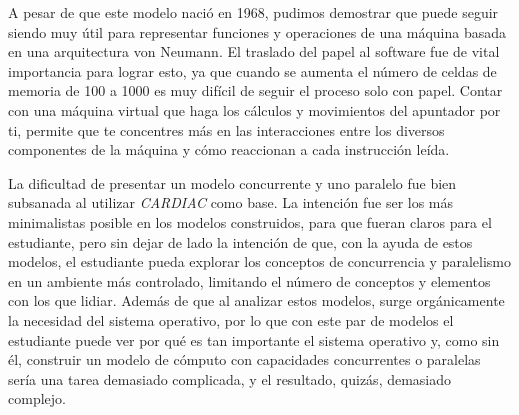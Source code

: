 \documentclass[letterpaper,12pt,oneside]{book}
\begin{document}
			A pesar de que este modelo nació en 1968, pudimos demostrar que puede
			seguir siendo muy útil para representar funciones y operaciones de una máquina basada
			en una arquitectura von Neumann. El traslado del papel al software fue de vital importancia para lograr esto, ya que cuando se aumenta
			el número de celdas de memoria de 100 a 1000 es muy difícil de seguir el proceso solo con papel. Contar con una máquina virtual que haga los
			cálculos y movimientos del apuntador por ti, permite que te concentres más en las interacciones  
			entre los diversos componentes de la máquina y cómo reaccionan a cada instrucción leída.
			
			La dificultad de presentar un modelo concurrente y uno paralelo fue bien subsanada al
			utilizar \textit{CARDIAC} como base. La intención fue ser
			los más minimalistas posible en los modelos construidos, para que fueran claros para el estudiante, pero sin dejar de lado la intención
			de que, con la ayuda de estos modelos, el estudiante pueda explorar los conceptos de concurrencia y paralelismo en un ambiente
			más controlado, limitando el número de conceptos y elementos con los que lidiar. Además de que al analizar estos modelos,
			surge orgánicamente la necesidad del sistema operativo, por lo que con este par de modelos el estudiante puede ver
			por qué es tan importante el sistema operativo y, como sin él, construir un modelo de cómputo con capacidades concurrentes o paralelas
			sería una tarea demasiado complicada, y el resultado, quizás, demasiado complejo.
			
\end{document}
